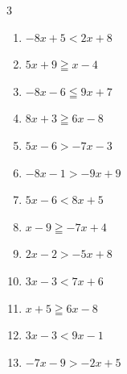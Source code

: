 \begin{multicols}{3}
\begin{enumerate}

\columnbreak %

  \item $-8x+5<2x+8$


  \item $5x+9\geqq x-4$


  \item $-8x-6\leqq 9x+7$


  \item $8x+3\geqq 6x-8$


  \item $5x-6>-7x-3$


  \item $-8x-1>-9x+9$

        \phantom{$\displaystyle x>10$}

  \item $5x-6<8x+5$


  \item $x-9\geqq -7x+4$


  \item $2x-2>-5x+8$


  \item $3x-3<7x+6$


  \item $x+5\geqq 6x-8$


  \item $3x-3<9x-1$


  \item $-7x-9>-2x+5$



\end{enumerate}
\end{multicols}

